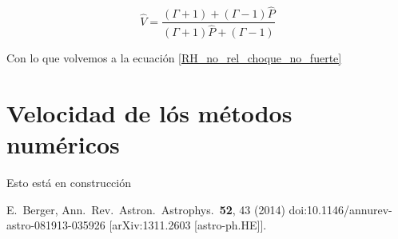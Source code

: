 \documentclass[12pt,a4paper]{book}
\begin{document}
\begin{equation}
\hat { V } = \frac { ( \Gamma + 1 ) + ( \Gamma - 1 ) \hat { P } } { ( \Gamma + 1 ) \hat { P } + ( \Gamma - 1 ) }
\end{equation}

Con lo que volvemos a la ecuación \ref{RH_no_rel_choque_no_fuerte}

\chapter{Velocidad de lós métodos numéricos} \label{aped.D}

Esto está en construcción

\begin{thebibliography}{20}


  E.~Berger,
  Ann.\ Rev.\ Astron.\ Astrophys.\  {\bf 52}, 43 (2014)
  doi:10.1146/annurev-astro-081913-035926
  [arXiv:1311.2603 [astro-ph.HE]].
 

 
\end{thebibliography}
\end{document}
